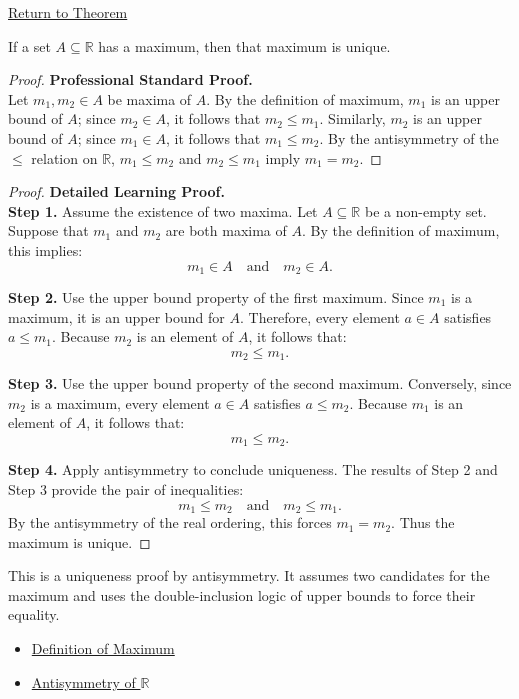 \newpage
{}
\label{prf:uniqueness-of-the-maximum}

\begin{remark*}[Return]
\hyperref[prop:uniqueness-of-the-maximum]{Return to Theorem}
\end{remark*}

\begin{theorem*}
If a set $A \subseteq \mathbb{R}$ has a maximum, then that maximum is unique.
\end{theorem*}

\begin{proof}
\textbf{Professional Standard Proof.}~\\
Let $m_1, m_2 \in A$ be maxima of $A$. By the definition of maximum, $m_1$ is an upper bound of $A$; since $m_2 \in A$, it follows that $m_2 \le m_1$. Similarly, $m_2$ is an upper bound of $A$; since $m_1 \in A$, it follows that $m_1 \le m_2$. By the antisymmetry of the $\le$ relation on $\mathbb{R}$, $m_1 \le m_2$ and $m_2 \le m_1$ imply $m_1 = m_2$.
\end{proof}

\begin{proof}
\textbf{Detailed Learning Proof.}~\\

\textbf{Step 1.} Assume the existence of two maxima.
Let $A \subseteq \mathbb{R}$ be a non-empty set. Suppose that $m_1$ and $m_2$ are both maxima of $A$. By the definition of maximum, this implies:
\[
m_1 \in A \quad \text{and} \quad m_2 \in A.
\]

\textbf{Step 2.} Use the upper bound property of the first maximum.
Since $m_1$ is a maximum, it is an upper bound for $A$. Therefore, every element $a \in A$ satisfies $a \le m_1$. Because $m_2$ is an element of $A$, it follows that:
\[
m_2 \le m_1.
\]

\textbf{Step 3.} Use the upper bound property of the second maximum.
Conversely, since $m_2$ is a maximum, every element $a \in A$ satisfies $a \le m_2$. Because $m_1$ is an element of $A$, it follows that:
\[
m_1 \le m_2.
\]

\textbf{Step 4.} Apply antisymmetry to conclude uniqueness.
The results of Step 2 and Step 3 provide the pair of inequalities:
\[
m_1 \le m_2 \quad \text{and} \quad m_2 \le m_1.
\]
By the antisymmetry of the real ordering, this forces $m_1 = m_2$. Thus the maximum is unique.
\end{proof}

\begin{remark*}
This is a uniqueness proof by antisymmetry. It assumes two candidates for the maximum and uses the double-inclusion logic of upper bounds to force their equality.
\end{remark*}

\begin{remark*}[Dependencies]\hfill
\begin{itemize}
  \item \hyperref[def:maximum]{Definition of Maximum}
  \item \hyperref[ax:antisymmetry]{Antisymmetry of $\mathbb{R}$}
\end{itemize}
\end{remark*}